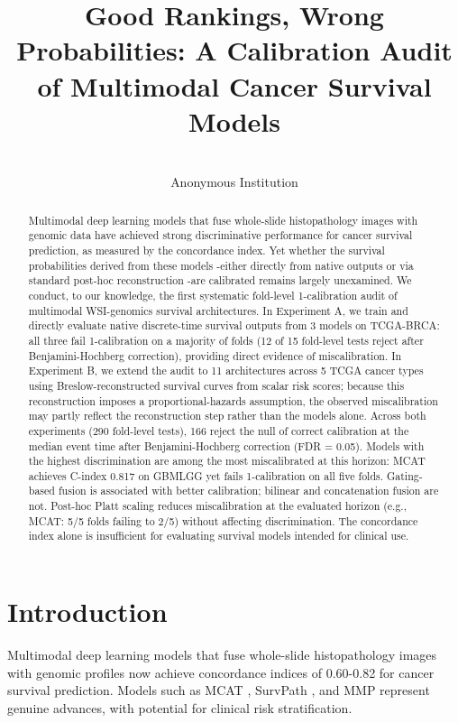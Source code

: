 \documentclass[pmlr]{jmlr}
\title[Good Rankings, Wrong Probabilities]{Good Rankings, Wrong Probabilities: A Calibration Audit of Multimodal Cancer Survival Models}
\author{\Name{Anonymous}
       \Email{anonymous@anonymous.org}\\
       \addr Anonymous Institution}
\begin{document}
\maketitle

\begin{abstract}
Multimodal deep learning models that fuse whole-slide histopathology images with genomic data have achieved strong discriminative performance for cancer survival prediction, as measured by the concordance index. Yet whether the survival probabilities derived from these models -either directly from native outputs or via standard post-hoc reconstruction -are calibrated remains largely unexamined. We conduct, to our knowledge, the first systematic fold-level 1-calibration audit of multimodal WSI-genomics survival architectures. In Experiment A, we train and directly evaluate native discrete-time survival outputs from 3 models on TCGA-BRCA: all three fail 1-calibration on a majority of folds (12 of 15 fold-level tests reject after Benjamini-Hochberg correction), providing direct evidence of miscalibration. In Experiment B, we extend the audit to 11 architectures across 5 TCGA cancer types using Breslow-reconstructed survival curves from scalar risk scores; because this reconstruction imposes a proportional-hazards assumption, the observed miscalibration may partly reflect the reconstruction step rather than the models alone. Across both experiments (290 fold-level tests), 166 reject the null of correct calibration at the median event time after Benjamini-Hochberg correction (FDR = 0.05). Models with the highest discrimination are among the most miscalibrated at this horizon: MCAT achieves C-index 0.817 on GBMLGG yet fails 1-calibration on all five folds. Gating-based fusion is associated with better calibration; bilinear and concatenation fusion are not. Post-hoc Platt scaling reduces miscalibration at the evaluated horizon (e.g., MCAT: 5/5 folds failing to 2/5) without affecting discrimination. The concordance index alone is insufficient for evaluating survival models intended for clinical use.
\end{abstract}

\section{Introduction}

Multimodal deep learning models that fuse whole-slide histopathology images with genomic profiles now achieve concordance indices of 0.60-0.82 for cancer survival prediction. Models such as MCAT \citep{chen2021multimodal}, SurvPath \citep{jaume2024modeling}, and MMP \citep{song2024multimodal} represent genuine advances, with potential for clinical risk stratification.
\end{document}
